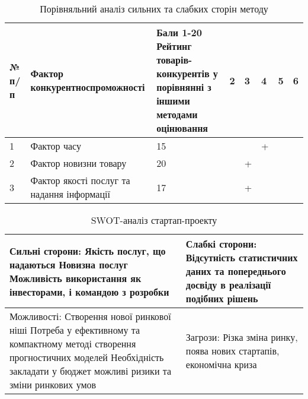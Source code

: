 \begin{table}[h!]
\fontsize{12pt}{12pt}\selectfont
	\begin{tabularx}{\textwidth}{|l|X|X|X|X|X|X|X|}
    \hline
    № п/п & Фактор конкурентноспроможності & Бали 1-20 Рейтинг товарів-конкурентів у порівнянні з іншими методами оцінювання & 2 & 3 & 4 & 5 & 6 \\ \hline
    1 & Фактор часу & 15 & & & + & & \\ \hline
    2 & Фактор новизни товару & 20 & & + & & & \\ \hline
    3 & Фактор якості послуг та надання інформації & 17 & & + & & & \\
    \hline
    \end{tabularx}
\caption{Порівняльний аналіз сильних та слабких сторін методу} \label{tab:stab_7}
\end{table}

\begin{table}[h!]
\fontsize{12pt}{12pt}\selectfont
	\begin{tabularx}{\textwidth}{|X|X|}
    \hline
    Сильні сторони: 
    Якість послуг, що надаються
    Новизна послуг
    Можливість використання як інвесторами, і командою з розробки
     & Слабкі сторони:
     Відсутність статистичних даних та попереднього досвіду в реалізації подібних рішень \\ \hline
    Можливості: 
    Створення нової ринкової ніші
    Потреба у ефективному та компактному методі створення прогностичних моделей
    Необхідність закладати у бюджет можливі ризики та зміни ринкових умов
     & Загрози:
     Різка зміна ринку, поява нових стартапів, економічна криза \\
    \hline
    \end{tabularx}
\caption{SWOT-аналіз стартап-проекту} \label{tab:stab_8}
\end{table}

